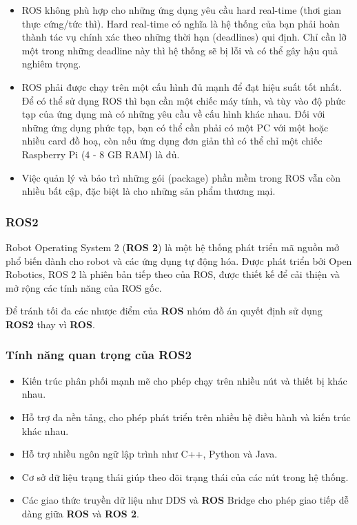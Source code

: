 \begin{itemize}
    \item ROS không phù hợp cho những ứng dụng yêu cầu hard real-time (thơi gian thực cứng/tức thì). Hard real-time có nghĩa là hệ thống của bạn phải hoàn thành tác vụ chính xác theo những thời hạn (deadlines) qui định. Chỉ cần lỡ một trong những deadline này thì hệ thống sẽ bị lỗi và có thể gây hậu quả nghiêm trọng. 
    \item ROS phải được chạy trên một cấu hình đủ mạnh để đạt hiệu suất tốt nhất. Để có thể sử dụng ROS thì bạn cần một chiếc máy tính, và tùy vào độ phức tạp của ứng dụng mà có những yêu cầu về cấu hình khác nhau. Đối với những ứng dụng phức tạp, bạn có thể cần phải có một PC với một hoặc nhiều card đồ hoạ, còn nếu ứng dụng đơn giản thì có thể chỉ một chiếc Raspberry Pi (4 - 8 GB RAM) là đủ.
    \item Việc quản lý và bảo trì những gói (package) phần mềm trong ROS vẫn còn nhiều bất cập, đặc biệt là cho những sản phẩm thương mại.
\end{itemize}
\newpage
\subsubsection{ROS2}
Robot Operating System 2 (\textbf{ROS 2}) là một hệ thống phát triển mã nguồn mở phổ biến dành cho robot và các ứng dụng tự động hóa. Được phát triển bởi Open Robotics, ROS 2 là phiên bản tiếp theo của ROS, được thiết kế để cải thiện và mở rộng các tính năng của ROS gốc.

\noindent Để tránh tối đa các nhược điểm của \textbf{ROS} nhóm đồ án quyết định sử dụng \textbf{ROS2} thay vì \textbf{ROS}.
\subsubsection*{Tính năng quan trọng của ROS2}


\begin{itemize}
    \item Kiến trúc phân phối mạnh mẽ cho phép chạy trên nhiều nút và thiết bị khác nhau.
    \item Hỗ trợ đa nền tảng, cho phép phát triển trên nhiều hệ điều hành và kiến trúc khác nhau.
    \item Hỗ trợ nhiều ngôn ngữ lập trình như C++, Python và Java.
    \item Cơ sở dữ liệu trạng thái giúp theo dõi trạng thái của các nút trong hệ thống.
    \item Các giao thức truyền dữ liệu như DDS và \textbf{ROS}  Bridge cho phép giao tiếp dễ dàng giữa \textbf{ROS}  và \textbf{ROS 2}.
\end{itemize}
